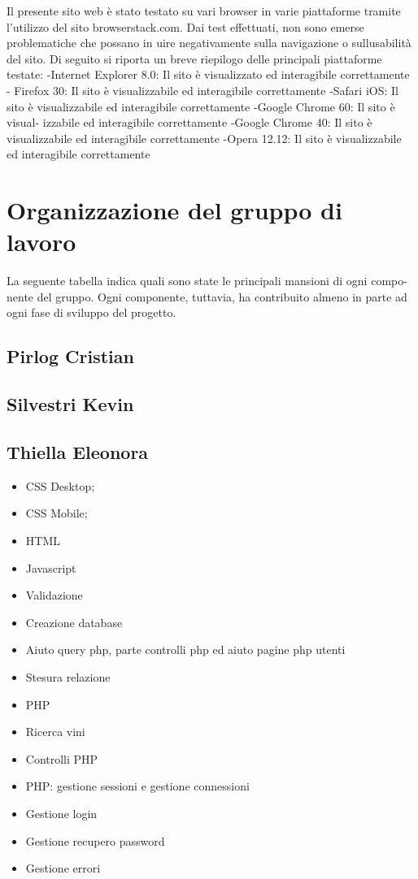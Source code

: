 Il presente sito web è stato testato su vari browser in varie piattaforme tramite l'utilizzo del sito browserstack.com. Dai test effettuati, non sono emerse problematiche che possano in
uire negativamente sulla navigazione o sullusabilità del sito.
Di seguito si riporta un breve riepilogo delle principali piattaforme testate:
-Internet Explorer 8.0: Il sito è visualizzato ed interagibile correttamente -
Firefox 30: Il sito è visualizzabile ed interagibile correttamente -Safari iOS: Il sito
è visualizzabile ed interagibile correttamente -Google Chrome 60: Il sito è visual-
izzabile ed interagibile correttamente -Google Chrome 40: Il sito è visualizzabile
ed interagibile correttamente -Opera 12.12: Il sito è visualizzabile ed interagibile
correttamente

\section{Organizzazione del gruppo di lavoro}

La seguente tabella indica quali sono state le principali mansioni di ogni compo-
nente del gruppo. Ogni componente, tuttavia, ha contribuito almeno in parte ad
ogni fase di sviluppo del progetto.

\subsection{Pirlog Cristian}

\subsection{Silvestri Kevin}

\subsection{Thiella Eleonora}

\begin{itemize}
	\item CSS Desktop;
	\item CSS Mobile;
	\item HTML
	\item Javascript
	\item Validazione
	\item Creazione database
	\item Aiuto query php, parte controlli php ed aiuto pagine php utenti
	\item Stesura relazione
	\item PHP
	\item Ricerca vini
	\item Controlli PHP
	\item PHP: gestione sessioni e gestione connessioni
	\item Gestione login
	\item Gestione recupero password
	\item Gestione errori
\end{itemize}

